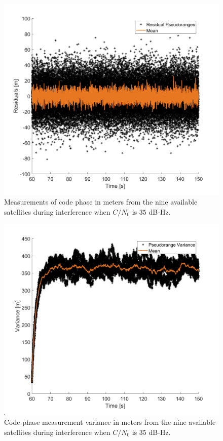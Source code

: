 \documentclass[12pt]{report}
\begin{document}
\begin{figure}[!ht]
\centering
\includegraphics[width=0.75\linewidth]{Figures/Results/Scenario1/Case35/codephase.png}
\caption{Measurements of code phase in meters from the nine available satellites during interference when \(C/N_0\) is \(35\) dB-Hz.}\label{fig:codephase35}
\end{figure}

\begin{figure}[!ht]
  \centering
  \includegraphics[width=0.75\linewidth]{Figures/Results/Scenario1/Case35/codeVariance.png}
  \caption{Code phase measurement variance in meters from the nine available satellites during interference when \(C/N_0\) is \(35\) dB-Hz.}\label{fig:codephaseVariance35}
\end{figure}
\end{document}

